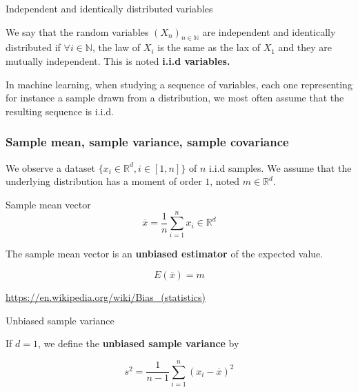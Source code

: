 \documentclass[
10pt, %
a4paper, %
oneside, %
headinclude,footinclude, %
BCOR5mm, %
]{scrartcl}
\begin{document}
\begin{definition}{Independent and identically distributed variables}

    We say that the random variables $(X_n)_{n\in \mathbb{N} }$ are independent and identically distributed if $\forall i\in \mathbb{N} $, the law of $X_i$ is the same as the lax of $X_1$ and they are mutually independent. This is noted \textbf{{i.i.d variables.}} 
\end{definition}

\begin{remark}
    In machine learning, when studying a sequence of variables, each one representing for instance a sample drawn from a distribution, we most often assume that the resulting sequence is i.i.d.
\end{remark}


\subsubsection{\large\color{Periwinkle}Sample mean, sample variance, sample covariance}
\label{sec:empstats}

We observe a dataset $ \{x_i\in \mathbb{R}^d, i\in [1, n]\}$ of $n$ i.i.d samples. We assume that the underlying distribution has a moment of order $1$, noted $m\in \mathbb{R}^d$.

\begin{definition}{Sample mean vector}
    \begin{equation*}
	\overline{x} = \frac{1}{n} \sum^{n}_{i=1} x_i\in \mathbb{R}^d
    \end{equation*}
\end{definition}

\begin{remark}
The sample mean vector is an \textbf{{unbiased estimator}} of the expected value.

\begin{equation}
    E( \overline{x}) = m
\end{equation}

\url{https://en.wikipedia.org/wiki/Bias_(statistics)}
\end{remark}

\begin{definition}{Unbiased sample variance}

    If $d=1$, we define the \textbf{{unbiased sample variance}} by

    \begin{equation*}
	s^2= \frac{1}{n-1}  \sum^{n}_{i=1} (x_i- \overline{x})^2
    \end{equation*}
\end{definition}
\end{document}

